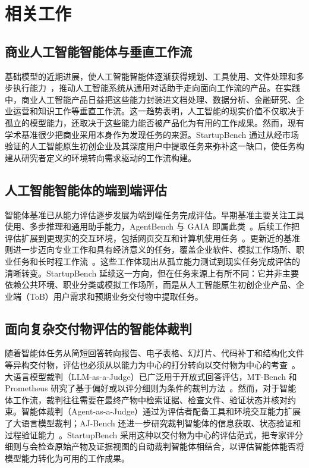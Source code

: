 \section{相关工作}

\subsection{商业人工智能智能体与垂直工作流}
基础模型的近期进展，使人工智能智能体逐渐获得规划、工具使用、文件处理和多步执行能力~\citep{yao2023react, schick2023toolformer}，推动人工智能系统从通用对话助手走向面向工作流的产品。在实践中，商业人工智能产品日益把这些能力封装进文档处理、数据分析、金融研究、企业运营和知识工作等垂直工作流。这一趋势表明，人工智能的现实价值不仅取决于孤立的模型能力，还取决于这些能力能否被产品化为有用的工作成果。然而，现有学术基准很少把商业采用本身作为发现任务的来源。StartupBench 通过从经市场验证的人工智能原生初创企业及其深度用户中提取任务来弥补这一缺口，使任务构建从研究者定义的环境转向需求驱动的工作流构建。

\subsection{人工智能智能体的端到端评估}
智能体基准已从能力评估逐步发展为端到端任务完成评估。早期基准主要关注工具使用、多步推理和通用助手能力，AgentBench 与 GAIA 即属此类~\citep{liu2024agentbench, mialon2024gaia}。后续工作把评估扩展到更现实的交互环境，包括网页交互和计算机使用任务~\citep{zhou2024webarena, xieosworld}。更新近的基准则进一步迈向专业工作和具有经济意义的任务，覆盖企业软件、模拟工作场所、职业任务和长时程工作流~\citep{drouin2403workarena, xu2026theagentcompany, patwardhan2025gdpval, hu2026occubenchevaluatingaiagents, zhu2026workflowgymlonghorizonevaluationcomputeruse,meng2026dvworld}。这些工作体现出从孤立能力测试到现实任务完成评估的清晰转变。StartupBench 延续这一方向，但在任务来源上有所不同：它并非主要依赖公共环境、职业分类或模拟工作场所，而是从人工智能原生初创企业产品、企业端（ToB）用户需求和预期业务交付物中提取任务。

\subsection{面向复杂交付物评估的智能体裁判}
随着智能体任务从简短回答转向报告、电子表格、幻灯片、代码补丁和结构化文件等异构交付物，评估也必须从以能力为中心的打分转向以交付物为中心的考查~\cite{you2026agent}。大语言模型裁判（LLM-as-a-Judge）已广泛用于开放式回答评估，MT-Bench 和 Prometheus 研究了基于偏好或以评分细则为条件的裁判方法~\citep{zheng2023judging, kim2024prometheus}。然而，对于智能体工作流，裁判往往需要在最终产物中检索证据、检查文件、验证状态并核对约束。智能体裁判（Agent-as-a-Judge）通过为评估者配备工具和环境交互能力扩展了大语言模型裁判；AJ-Bench 还进一步研究裁判智能体的信息获取、状态验证和过程验证能力~\citep{zhuge2024agent, shi2026aj}。StartupBench 采用这种以交付物为中心的评估范式，把专家评分细则与会检查原始产物及证据视图的自动裁判智能体相结合，以评估智能体能否将模型能力转化为可用的工作成果。

